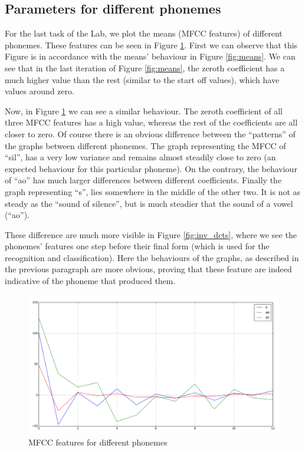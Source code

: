 \documentclass[12pt,a4paper,oneside]{article}
\begin{document}
\subsection{Parameters for different phonemes}
For the last task of the Lab, we plot the means (MFCC features) of different phonemes. These features can be seen in Figure \ref{fig:mfccs}. First we can observe that this Figure is in accordance with the means' behaviour in Figure \ref{fig:means}. We can see that in the last iteration of Figure \ref{fig:means}, the zeroth coefficient has a much higher value than the rest (similar to the start off values), which have values around zero.

Now, in Figure \ref{fig:mfccs} we can see a similar behaviour. The zeroth coefficient of all three MFCC features has a high value, whereas the rest of the coefficients are all closer to zero. Of course there is an obvious difference between the ``patterns'' of the graphs between different phonemes. The graph representing the MFCC of ``sil'', has a very low variance and remains almost steadily close to zero (an expected behaviour for this particular phoneme). On the contrary, the behaviour of ``ao''  has much larger differences between different coefficients. Finally the graph representing ``s'', lies somewhere in the middle of the other two. It is not as steady as the ``sound of silence'', but is much steadier that the sound of a vowel (``ao'').

These difference are much more visible in Figure \ref{fig:inv_dcts}, where we see the phonemes' features one step before their final form (which is used for the recognition and classification). Here the behaviours of the graphs, as described in the previous paragraph are more obvious, proving that these feature are indeed indicative of the phoneme that produced them. 

\begin{figure}
\includegraphics[scale=0.4]{mfccs.png}
\caption{MFCC features for different phonemes}
\label{fig:mfccs}
\end{figure}
\end{document}
